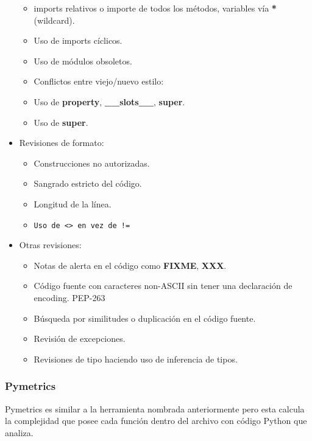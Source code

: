 \begin{itemize}
\begin{itemize}
    \item imports relativos o importe de todos los métodos, variables vía \textbf{*} (wildcard).
    \item Uso de imports cíclicos.
    \item Uso de módulos obsoletos.
    \item Conflictos entre viejo/nuevo estilo:
    \item Uso de \textbf{property}, \textbf{\_\_slots\_\_}, \textbf{super}.
    \item Uso de \textbf{super}.
    \end{itemize}
  \item Revisiones de formato:
    \begin{itemize}
    \item Construcciones no autorizadas.
    \item Sangrado estricto del código.
    \item Longitud de la línea.
    \item \lstinline{Uso de <> en vez de !=}
    \end{itemize}
  \item Otras revisiones:
    \begin{itemize}
    \item Notas de alerta en el código como \textbf{FIXME}, \textbf{XXX}.
    \item Código fuente con caracteres non-ASCII sin tener una declaración de encoding. PEP-263
    \item Búsqueda por similitudes o duplicación en el código fuente.
    \item Revisión de excepciones.
    \item Revisiones de tipo haciendo uso de inferencia de tipos.
    \end{itemize}
\end{itemize}

\subsubsection{Pymetrics}
Pymetrics es similar a la herramienta nombrada anteriormente pero esta calcula la complejidad que posee cada función dentro del archivo con código Python que analiza.\\
